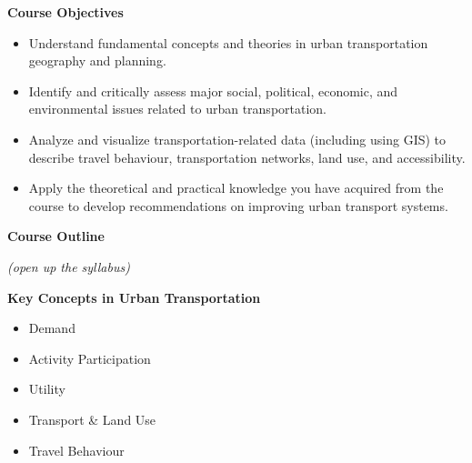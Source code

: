 \documentclass[aspectratio=169]{beamer}
\begin{document}
\begin{frame}

\textbf{Course Objectives}
		\small
		\begin{itemize}
			\item Understand fundamental concepts and theories in urban transportation geography and planning.
			
			\item Identify and critically assess major social, political, economic, and environmental issues related to urban transportation.
			
			\item Analyze and visualize transportation-related data (including using GIS) to describe travel behaviour, transportation networks, land use, and accessibility.
			
			\item Apply the theoretical and practical knowledge you have acquired from the course to develop recommendations on improving urban transport systems.
		\end{itemize}

\end{frame}





\begin{frame}
	\LARGE{\textbf{Course Outline}}
	
	\vspace{4mm}
	
	\small
	\textit{(open up the syllabus)}
\end{frame}





\begin{frame}
	\LARGE{\textbf{Key Concepts in Urban Transportation}}
	\normalsize
	\vspace{4mm}
	\begin{itemize}
		\item Demand
		\item Activity Participation
		\item Utility
		\item Transport \& Land Use
		\item Travel Behaviour
	\end{itemize}
\end{frame}


\end{document}
